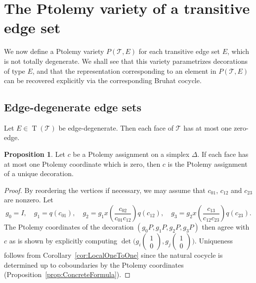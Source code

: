 \documentclass[11pt]{amsart}
\theoremstyle{plain}
\theoremstyle{definition}
\newtheorem{proposition}[theorem]{Proposition}
\numberwithin{equation}{section}
\newcommand{\T}{\mathcal T}
\DeclareMathOperator{\TE}{T}
\begin{document}
\section{The Ptolemy variety of a transitive edge set}\label{sec:InvariantPtolemy}
We now define a Ptolemy variety $P(\T,E)$ for each transitive edge set $E$, which is not totally degenerate. We shall see that this variety parametrizes decorations of type $E$, and that the representation corresponding to an element in $P(\T,E)$ can be recovered explicitly via the corresponding Bruhat cocycle. 
\subsection{Edge-degenerate edge sets}

Let $E\in\TE(\T)$ be edge-degenerate. Then each face of $\T$ has at most one zero-edge. 
\begin{proposition}\label{prop:RecoverDec}
Let $c$ be a Ptolemy assignment on a simplex $\Delta$. If each face has at most one Ptolemy coordinate which is zero, then $c$ is the Ptolemy assignment of a unique decoration.
\end{proposition}
\begin{proof}
By reordering the vertices if necessary, we may assume that $c_{01}$, $c_{12}$ and $c_{23}$ are nonzero. Let
\begin{equation}
g_0=I,\quad g_1=q(c_{01}),\quad g_2=g_1x(\frac{c_{02}}{c_{01}c_{12}})q(c_{12}),\quad g_3=g_2x(\frac{c_{13}}{c_{12}c_{23}})q(c_{23}).
\end{equation}
The Ptolemy coordinates of the decoration $(g_0P,g_1P,g_2P,g_3P)$ then agree with $c$ as is shown by explicitly computing $\det\big(g_{i}\left(\begin{smallmatrix}1\\0\end{smallmatrix}\right),g_{j}\left(\begin{smallmatrix}1\\0\end{smallmatrix}\right)\big)$. Uniqueness follows from Corollary~\ref{cor:LocalOneToOne} since the natural cocycle is determined up to coboundaries by the Ptolemy coordinates (Proposition~\ref{prop:ConcreteFormula}).
\end{proof}
\end{document}
